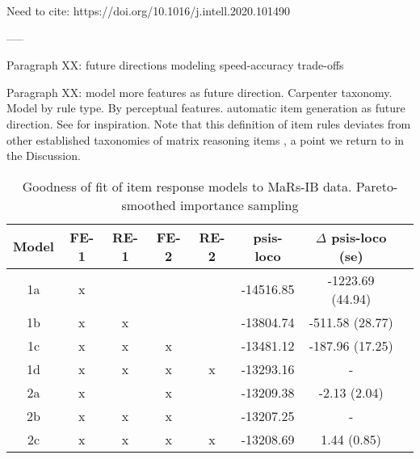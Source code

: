 \documentclass[a4paper,man,natbib]{apa6}
\begin{document}
Need to cite: https://doi.org/10.1016/j.intell.2020.101490

-----

Paragraph XX: future directions modeling speed-accuracy trade-offs

Paragraph XX: model more features as future direction. Carpenter taxonomy. Model by rule type. By perceptual features. automatic item generation as future direction. See \cite{lathrop2017item} for inspiration. Note that this definition of item rules deviates from other established taxonomies of matrix reasoning items \citep{carpenter1990one}, a point we return to in the Discussion.



\begin{table}
    \centering
    \begin{tabular}{c|c|c|c|c|c|c|c}
    \hline
    Model & FE-1 & RE-1 & FE-2 & RE-2 & psis-loco & $\Delta$ psis-loco (se) \\
    \hline
    1a & x &   &   &   & -14516.85 & -1223.69 (44.94)\\
    1b & x & x &   &   & -13804.74 & -511.58 (28.77) \\
    1c & x & x & x &   & -13481.12 & -187.96 (17.25) \\
    1d & x & x & x & x & -13293.16 & - \\
    \hline
    2a & x &   & x &   & -13209.38 & -2.13 (2.04) \\
    2b & x & x & x &   & -13207.25 & - \\
    2c & x & x & x & x & -13208.69 & 1.44 (0.85) \\
    \hline
    \end{tabular}
    \caption{\label{tab:1} Goodness of fit of item response models to MaRs-IB data. Pareto-smoothed importance sampling}
    \label{table:1}
\end{table}
\end{document}
